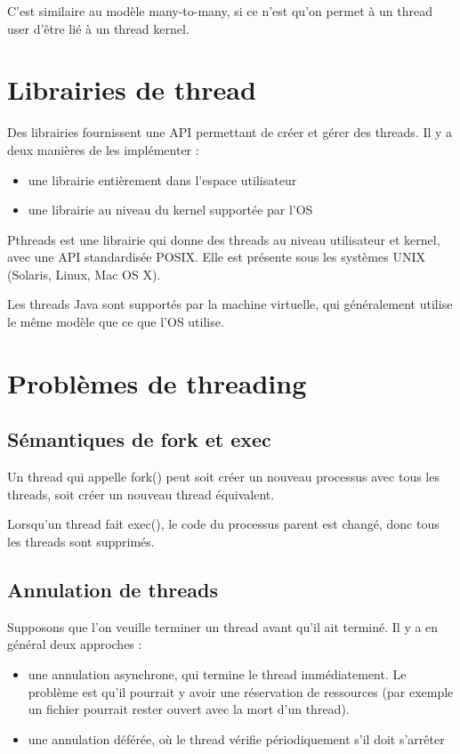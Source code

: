 	C'est similaire au modèle many-to-many, si ce n'est qu'on permet à un thread user d'être lié à un thread kernel.
	
	
\section{Librairies de thread}

Des librairies fournissent une API permettant de créer et gérer des threads. Il y a deux manières de les implémenter :

\begin{itemize}
	\item une librairie entièrement dans l'espace utilisateur
	\item une librairie au niveau du kernel supportée par l'OS
\end{itemize}

Pthreads est une librairie qui donne des threads au niveau utilisateur et kernel, avec une API standardisée POSIX. Elle est présente sous les systèmes UNIX (Solaris, Linux, Mac OS X).

Les threads Java sont supportés par la machine virtuelle, qui généralement utilise le même modèle que ce que l'OS utilise.

\section{Problèmes de threading}

	\subsection{Sémantiques de fork et exec}
	
	Un thread qui appelle fork() peut soit créer un nouveau processus avec tous les threads, soit créer un nouveau thread équivalent.
	
	Lorsqu'un thread fait exec(), le code du processus parent est changé, donc tous les threads sont supprimés.
	
	\subsection{Annulation de threads}
	
	Supposons que l'on veuille terminer un thread avant qu'il ait terminé. Il y a en général deux approches :
	
	\begin{itemize}
		\item une annulation asynchrone, qui termine le thread immédiatement. Le problème est qu'il pourrait y avoir une réservation de ressources (par exemple un fichier pourrait rester ouvert avec la mort d'un thread).
		\item une annulation déférée, où le thread vérifie périodiquement s'il doit s'arrêter
	\end{itemize}
	
